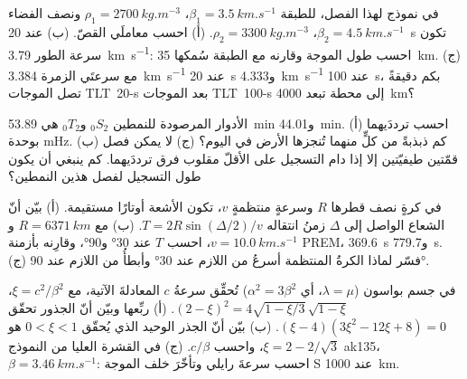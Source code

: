 \begin{exercise}[$\star$]\label{exo:b3:seismology-imaging:3}
في نموذج  لهذا الفصل، للطبقة $\beta_1 =
\qty{3.5}{km.s^{-1}}$، $\rho_1 = \qty{2700}{kg.m^{-3}}$ ونصف الفضاء
$\beta_2 = \qty{4.5}{km.s^{-1}}$، $\rho_2 = \qty{3300}{kg.m^{-3}}$.
(أ) احسب معاملَي القصّ. (ب) عند \qty{20}{s} تكون سرعة الطور
\qty{3.79}{km.s^{-1}}: احسب طول الموجة وقارنه مع الطبقة
سُمكها \qty{35}{km}. (ج) مع سرعتَي الزمرة \qty{3.384}{km.s^{-1}} عند
\qty{20}{s} و\qty{4.333}{km.s^{-1}} عند \qty{100}{s}، بكم دقيقةً تصل
الموجات \mbox{\textdir TLT 20-s} بعد الموجات \mbox{\textdir TLT 100-s} إلى محطة تبعد \qty{4000}{km}؟
\end{exercise}

\begin{exercise}[$\star$]\label{exo:b3:seismology-imaging:4}
الأدوار المرصودة للنمطين ${}_0S_2$ و${}_0T_2$ هي \qty{53.89}{min}
و\qty{44.01}{min}. (أ) احسب ترددَيهما بوحدة \unit{mHz}. (ب) كم
ذبذبةً من كلٍّ منهما تُنجزها الأرض في اليوم؟ (ج) لا يمكن فصل قمّتين طيفيّتين
إلا إذا دام التسجيل على الأقلّ مقلوب
فرق ترددَيهما. كم ينبغي أن يكون طول التسجيل لفصل هذين النمطين؟
\end{exercise}

\begin{exercise}[$\star\star$]\label{exo:b3:seismology-imaging:5}
في كرةٍ نصف قطرها $R$ وسرعةٍ منتظمةٍ $v$، تكون الأشعة أوتارًا مستقيمة.
(أ) بيّن أنّ الشعاع الواصل إلى $\Delta$ زمنُ انتقاله
$T = 2R\sin(\Delta/2)/v$. (ب) مع $R = \qty{6371}{km}$
و$v = \qty{10.0}{km.s^{-1}}$، احسب $T$ عند \ang{30} و\ang{90}، وقارِنه
بأزمنة PREM، \qty{369.6}{s} و\qty{779.7}{s}. (ج) فسّر لماذا
الكرةُ المنتظمة أسرعُ من اللازم عند \ang{30} وأبطأُ من اللازم عند \ang{90}.
\end{exercise}

\begin{exercise}[$\star\star$]\label{exo:b3:seismology-imaging:6}
في جسم بواسون ($\lambda = \mu$، أي $\alpha^2 = 3\beta^2$) تُحقِّق سرعةُ 
$c$ المعادلةَ الآتية، مع $\xi = c^2/\beta^2$،
$(2 - \xi)^2 = 4\sqrt{1 - \xi/3}\,\sqrt{1 - \xi}$. (أ) ربِّعها وبيّن
أنّ الجذور تحقّق $(\xi - 4)(3\xi^2 - 12\xi + 8) = 0$. (ب) بيّن أنّ
الجذر الوحيد الذي يُحقّق $0 < \xi < 1$ هو $\xi = 2 - 2/\sqrt3$، واحسب $c/\beta$.
(ج) في القشرة العليا من النموذج ak135، $\beta = \qty{3.46}{km.s^{-1}}$: احسب
سرعةَ رايلي وتأخّرَ  خلف الموجة S عند
\qty{1000}{km}.
\end{exercise}

